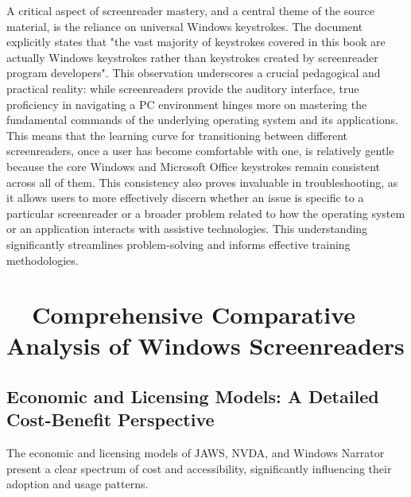 A critical aspect of screenreader mastery, and a central theme of the source material, is the reliance on universal Windows keystrokes. The document explicitly states that "the vast majority of keystrokes covered in this book are actually Windows keystrokes rather than keystrokes created by screenreader program developers".\supercite{kingsbury2025} This observation underscores a crucial pedagogical and practical reality: while screenreaders provide the auditory interface, true proficiency in navigating a PC environment hinges more on mastering the fundamental commands of the underlying operating system and its applications. This means that the learning curve for transitioning between different screenreaders, once a user has become comfortable with one, is relatively gentle because the core Windows and Microsoft Office keystrokes remain consistent across all of them.\supercite{kingsbury2025} This consistency also proves invaluable in troubleshooting, as it allows users to more effectively discern whether an issue is specific to a particular screenreader or a broader problem related to how the operating system or an application interacts with assistive technologies. This understanding significantly streamlines problem-solving and informs effective training methodologies.

\section{~~Comprehensive Comparative Analysis of Windows Screenreaders}

\subsection{Economic and Licensing Models: A Detailed Cost-Benefit Perspective}
The economic and licensing models of JAWS, NVDA, and Windows Narrator present a clear spectrum of cost and accessibility, significantly influencing their adoption and usage patterns.
